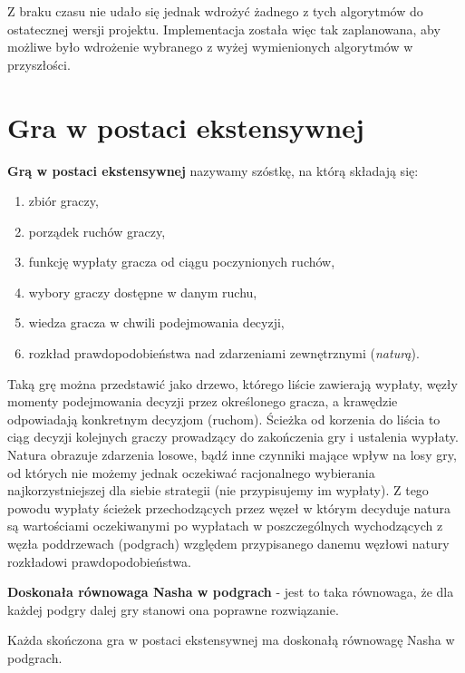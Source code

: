 \documentclass[polish]{standalone}
\begin{document}
Z braku czasu nie udało się jednak wdrożyć żadnego z tych algorytmów do ostatecznej wersji projektu. Implementacja
została więc tak zaplanowana, aby możliwe było wdrożenie wybranego z wyżej wymienionych algorytmów w przyszłości.

\section{Gra w postaci ekstensywnej}

\begin{definition}
\textbf{Grą w postaci ekstensywnej} nazywamy szóstkę, na którą składają się:
\begin{enumerate}
\item zbiór graczy,
\item porządek ruchów graczy,
\item funkcję wypłaty gracza od ciągu poczynionych ruchów,
\item wybory graczy dostępne w danym ruchu,
\item wiedza gracza w chwili podejmowania decyzji,
\item rozkład prawdopodobieństwa nad zdarzeniami zewnętrznymi (\textit{naturą}).
\end{enumerate}
\cite[str.~77--78]{FT-GT}
\end{definition}

Taką grę można przedstawić jako drzewo, którego liście zawierają wypłaty, węzły momenty podejmowania decyzji przez
określonego gracza, a krawędzie odpowiadają konkretnym decyzjom (ruchom). Ścieżka od korzenia do liścia to ciąg decyzji
kolejnych graczy prowadzący do zakończenia gry i ustalenia wypłaty. Natura obrazuje zdarzenia losowe, bądź inne czynniki
mające wpływ na losy gry, od których nie możemy jednak oczekiwać racjonalnego wybierania najkorzystniejszej dla siebie
strategii (nie przypisujemy im wypłaty). Z tego powodu wypłaty ścieżek przechodzących przez węzeł w którym decyduje
natura są wartościami oczekiwanymi po wypłatach w poszczególnych wychodzących z węzła poddrzewach (podgrach) względem
przypisanego danemu węzłowi natury rozkładowi prawdopodobieństwa.

\begin{definition}
\textbf{Doskonała równowaga Nasha w podgrach} - jest to taka równowaga, że dla każdej podgry dalej gry stanowi ona
poprawne rozwiązanie.
\end{definition}

\begin{theorem}
Każda skończona gra w postaci ekstensywnej ma doskonałą równowagę Nasha w podgrach.
\end{theorem}
\end{document}
